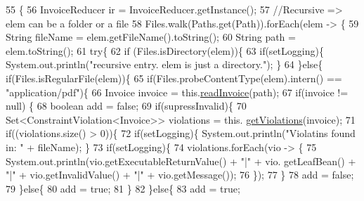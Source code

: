\begin{DoxyCode}
55     \{
56         InvoiceReducer ir = InvoiceReducer.getInstance();
57         \textcolor{comment}{//Recursive => elem can be a folder or a file }
58         Files.walk(Paths.get(Path)).forEach(elem -> \{
59             String fileName = elem.getFileName().toString();
60             String path = elem.toString();
61             \textcolor{keywordflow}{try}\{
62                 \textcolor{keywordflow}{if} (Files.isDirectory(elem))\{
63                     \textcolor{keywordflow}{if}(setLogging)\{ System.out.println(\textcolor{stringliteral}{"recursive entry. elem is just a directory."}); \}
64                 \}\textcolor{keywordflow}{else}\{  \textcolor{keywordflow}{if}(Files.isRegularFile(elem))\{
65                     \textcolor{keywordflow}{if}(Files.probeContentType(elem).intern() == \textcolor{stringliteral}{"application/pdf"})\{
66                         Invoice invoice = this.\hyperlink{class_import_1_1zugferd_handler_aea79c23595f003c943e908c95276ecf9}{readInvoice}(path);
67                         \textcolor{keywordflow}{if}(invoice != null) \{
68                             \textcolor{keywordtype}{boolean} add = \textcolor{keyword}{false};
69                             \textcolor{keywordflow}{if}(supressInvalid)\{
70                                 Set<ConstraintViolation<Invoice>> violations = this.
      \hyperlink{class_import_1_1zugferd_handler_acf26740b73f820812fadb01ccf712dd2}{getViolations}(invoice);
71                                 \textcolor{keywordflow}{if}((violations.size() > 0))\{
72                                     \textcolor{keywordflow}{if}(setLogging)\{ System.out.println(\textcolor{stringliteral}{"Violatins found in: "} + fileName); 
      \}
73                                     \textcolor{keywordflow}{if}(setLogging)\{ 
74                                         violations.forEach(vio -> \{
75                                             System.out.println(vio.getExecutableReturnValue() + \textcolor{stringliteral}{"|"} + vio.
      getLeafBean() + \textcolor{stringliteral}{"|"} + vio.getInvalidValue() + \textcolor{stringliteral}{"|"} + vio.getMessage());
76                                         \});
77                                     \}
78                                     add = \textcolor{keyword}{false};
79                                 \}\textcolor{keywordflow}{else}\{
80                                     add = \textcolor{keyword}{true};
81                                 \}
82                             \}\textcolor{keywordflow}{else}\{
83                                 add = \textcolor{keyword}{true};

\end{DoxyCode}
